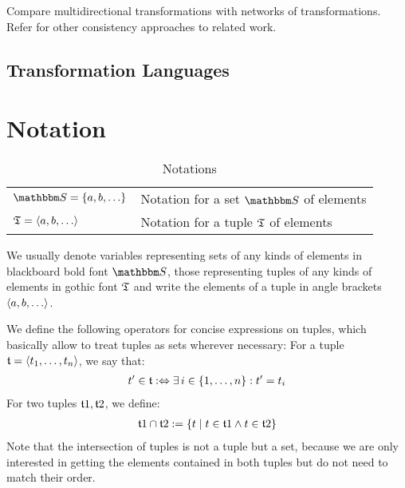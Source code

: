 
Compare multidirectional transformations with networks of transformations.
Refer for other consistency approaches to related work.

\subsection{Transformation Languages}


\section{Notation}

\begin{table}
\centering
\renewcommand{\arraystretch}{1.4}%
\begin{tabular}{R{4.8cm} L{5cm}}
\toprule
$\set{S}{} = \setted{a, b, \ldots}$ 
    & Notation for a set $\set{S}{}$ of elements\\
$\mathfrak{T}{} = \langle a, b, \ldots \rangle$ 
    & Notation for a tuple $\mathfrak{T}{}$ of elements\\
\bottomrule
\end{tabular}
\caption{Notations}
\label{tab:prologue:notation}
\end{table}

We usually denote variables representing sets of any kinds of elements in blackboard bold font $\set{S}{}$, those representing tuples of any kinds of elements in gothic font $\mathfrak{T}{}$ and write the elements of a tuple in angle brackets $\tupled{a, b, \dots}$.

We define the following operators for concise expressions on tuples, which basically allow to treat tuples as sets wherever necessary:
For a tuple $\mathfrak{t}{} = \langle t_1, \dots, t_n \rangle$, we say that:
\begin{align*}
    \formulaskip &
    t' \in \tuple{t}{} \equivalentperdefinition \exists i \in \setted{1, \dots, n} : t' = t_i
\end{align*}
For two tuples $\mathfrak{t}{1}, \mathfrak{t}{2}$, we define:
\begin{align*}
    \hspace{1em} &
    \mathfrak{t}{1} \cap \mathfrak{t}{2} := \{ t \mid t \in \mathfrak{t}{1} \land t \in \mathfrak{t}{2} \}
\end{align*}
Note that the intersection of tuples is not a tuple but a set, because we are only interested in getting the elements contained in both tuples but do not need to match their order.







